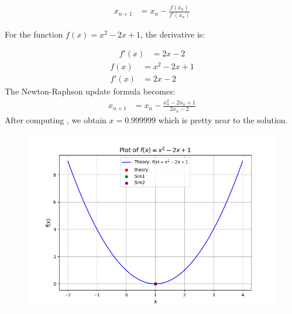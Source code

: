 \documentclass[journal]{IEEEtran}
\begin{document}
\begin{enumerate}
\begin{enumerate}
					\begin{align}
						x_{n+1} &= x_n - \frac{f(x_n)}{f'(x_n)}
					\end{align}

				For the function \( f(x) = x^2 - 2x + 1 \), the derivative is:

					\begin{align}
						f'(x) &= 2x - 2
					\end{align}
					\begin{align}
						f(x) &= x^2 - 2x + 1 \\
						f'(x) &= 2x - 2
					\end{align}
				The Newton-Raphson update formula becomes:
					\begin{align}
						x_{n+1} &= x_n - \frac{x_n^2 - 2x_n + 1}{2x_n - 2}
					\end{align}
				After computing , we obtain $x = 0.999999$ which is pretty near to the solution. \\ 
		\end{enumerate}
		
	

\begin{figure}[htbp]
           \centering
        \includegraphics[width=\textwidth]{fig/Figure_1.png} %
                \label{fig:fig1}
    
    \hspace{0.05\textwidth}
    

\end{figure}
\end{enumerate}
\end{document}
